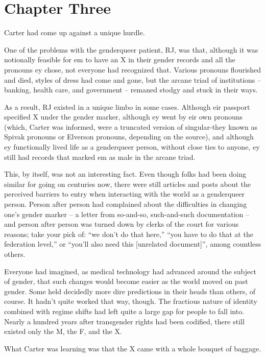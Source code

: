\chapter*{Chapter Three}

Carter had come up against a unique hurdle.

One of the problems with the genderqueer patient, RJ, was that, although it was notionally feasible for em to have an X in their gender records and all the pronouns ey chose, not everyone had recognized that.  Various pronouns flourished and died, styles of dress had come and gone, but the arcane triad of institutions -- banking, health care, and government -- remaned stodgy and stuck in their ways.

As a result, RJ existed in a unique limbo in some cases.  Although eir passport specified X under the gender marker, although ey went by eir own pronouns (which, Carter was informed, were a truncated version of singular-they known as Spivak pronouns or Elverson pronouns, depending on the source), and although ey functionally lived life as a genderqueer person, without close ties to anyone, ey still had records that marked em as male in the arcane triad.

This, by itself, was not an interesting fact.  Even though folks had been doing similar for going on centuries now, there were still articles and posts about the perceived barriers to entry when interacting with the world as a genderqueer person.  Person after person had complained about the difficulties in changing one's gender marker -- a letter from so-and-so, such-and-such documentation -- and person after person was turned down by clerks of the court for various reasons; take your pick of: ``we don't do that here,'' ``you have to do that at the federation level,'' or ``you'll also need this [unrelated document]'', among countless others.

Everyone had imagined, as medical technology had advanced around the subject of gender, that such changes would become easier as the world moved on past gender.  Some held decidedly more dire predictions in their heads than others, of course.  It hadn't quite worked that way, though.  The fractious nature of identity combined with regime shifts had left quite a large gap for people to fall into.  Nearly a hundred years after transgender rights had been codified, there still existed only the M, the F, and the X.

What Carter was learning was that the X came with a whole bouquet of baggage.

